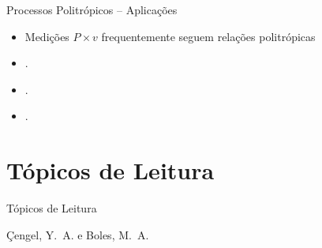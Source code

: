     \begin{frame}{Processos Politrópicos -- Aplicações}\vspace*{-2em}
        \begin{itemize}
            \item \alert{Medições} $P \times v$ frequentemente seguem relações politrópicas
                \\[\medskipamount]
            \item . \\[\medskipamount]
            \item . \\[\medskipamount]
            \item .
        \end{itemize}
    \end{frame}

\section{Tópicos de Leitura}

    \begin{frame}[allowframebreaks]{Tópicos de Leitura}
        \begin{thebibliography}{Çengel, Y.~A., 2013}
                Çengel, Y.~A. e Boles, M.~A.
        \end{thebibliography}
    \end{frame}




